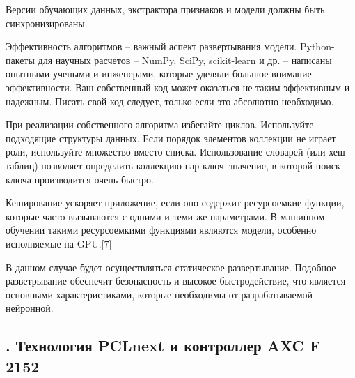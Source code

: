 {	\par \redline Версии обучающих данных, экстрактора признаков и модели должны быть
	синхронизированы.
	
	\par \redline Эффективность алгоритмов {--} важный аспект развертывания модели.
	Python-пакеты для научных расчетов – NumPy, SciPy, scikit-learn и др. – написаны опытными учеными и инженерами, которые уделяли большое внимание эффективности. Ваш собственный код может оказаться не таким эффективным и надежным. Писать свой код следует, только если это абсолютно
	необходимо.
	
	\par \redline При реализации собственного алгоритма избегайте циклов. Используйте подходящие структуры данных. Если порядок элементов коллекции не
	играет роли, используйте множество вместо списка. Использование словарей (или хеш-таблиц) позволяет определить коллекцию пар ключ–значение,
	в которой поиск ключа производится очень быстро.
	
	\par \redline Кеширование ускоряет приложение, если оно содержит ресурсоемкие
	функции, которые часто вызываются с одними и теми же параметрами. В машинном обучении такими ресурсоемкими функциями являются модели,
	особенно исполняемые на GPU.[7]
	
	\par \redline В данном случае будет осуществляться статическое развертывание. Подобное разветрывание обеспечит безопасность и высокое быстродействие, что является основными характеристиками, которые необходимы от разрабатываемой нейронной.

	\par
}


\subtitlespace

\subsection*{ 
	\gostTitleFont
	\redline
	\thechaptercntr .\thesubchaptercntr \spc
	Технология PCLnext и контроллер AXC F 2152
} \addtocounter{subchaptercntr}{1}

\subtitlespace

